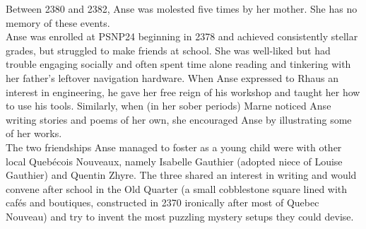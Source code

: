 \documentclass[12pt,a4paper,twocolumn]{article}
\begin{document}
	\indent Between 2380 and 2382, Anse was molested five times by her mother. She has no memory of these events.\\
	\indent Anse was enrolled at PSNP24 beginning in 2378 and achieved consistently stellar grades, but struggled to make friends at school. She was well-liked but had trouble engaging socially and often spent time alone reading and tinkering with her father's leftover navigation hardware. When Anse expressed to Rhaus an interest in engineering, he gave her free reign of his workshop and taught her how to use his tools. Similarly, when (in her sober periods) Marne noticed Anse writing stories and poems of her own, she encouraged Anse by illustrating some of her works.\\
	\indent The two friendships Anse managed to foster as a young child were with other local Quebécois Nouveaux, namely Isabelle Gauthier (adopted niece of Louise Gauthier) and Quentin Zhyre. The three shared an interest in writing and would convene after school in the Old Quarter (a small cobblestone square lined with cafés and boutiques, constructed in 2370 ironically after most of Quebec Nouveau) and try to invent the most puzzling mystery setups they could devise.\\
\end{document}
